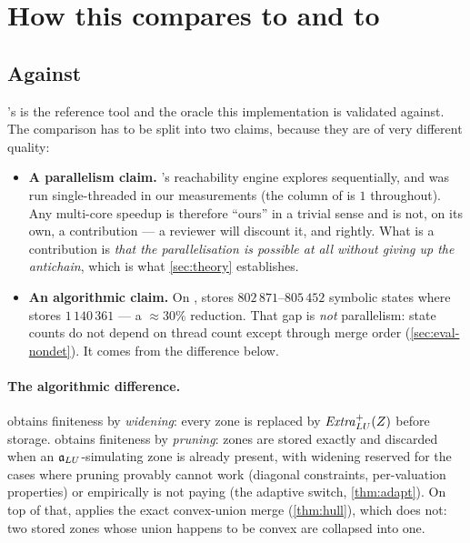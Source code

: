 \section{How this compares to \uppaal{} and to \ltsmin{}}
\label{sec:uppaal}

\subsection{Against \uppaal{}}

\uppaal{}'s  is the reference tool and the oracle this
implementation is validated against.  The comparison has to be split into two
claims, because they are of very different quality:

\begin{itemize}[leftmargin=1.2em, itemsep=3pt]
\item \textbf{A parallelism claim.}  's reachability engine
      explores sequentially, and was run single-threaded in our measurements
      (the  column of  is $1$ throughout).
      Any multi-core speedup is therefore ``ours'' in a
      trivial sense and is not, on its own, a contribution --- a reviewer will
      discount it, and rightly.  What is a contribution is \emph{that the
      parallelisation is possible at all without giving up the antichain}, which
      is what \cref{sec:theory} establishes.

\item \textbf{An algorithmic claim.}  On , \tool{} stores
      $802\,871$--$805\,452$ symbolic states where  stores
      $1\,140\,361$ --- a $\approx 30\%$ reduction.  That gap is \emph{not}
      parallelism: state counts do not depend on thread count except through
      merge order (\cref{sec:eval-nondet}).  It comes from the difference
      below.
\end{itemize}

\paragraph{The algorithmic difference.}
\uppaal{} obtains finiteness by \emph{widening}: every zone is replaced by
$\mathit{Extra}^{+}_{LU}(Z)$ before storage.  \tool{} obtains finiteness by \emph{pruning}:
zones are stored exactly and discarded when an $\mathfrak{a}_{LU}$-simulating zone is
already present, with widening reserved for the cases where pruning provably
cannot work (diagonal constraints, per-valuation properties) or empirically is
not paying (the adaptive switch, \cref{thm:adapt}).  On top of that, \tool{}
applies the exact convex-union merge (\cref{thm:hull}), which \uppaal{} does
not: two stored zones whose union happens to be convex are collapsed into one.

